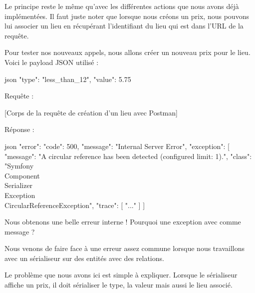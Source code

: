 \documentclass[big]{zmdocument}
\begin{document}
Le principe reste le même qu'avec les différentes actions que nous avons déjà implémentées.
Il faut juste noter que lorsque nous créons un prix, nous pouvons lui associer un lieu en récupérant l'identifiant du lieu qui est dans l'URL de la requête.



Pour tester nos nouveaux appels, nous allons créer un nouveau prix pour le lieu. Voici le payload JSON utilisé :



\begin{CodeBlock}{json}
{
    "type": "less_than_12",
    "value":  5.75
}
\end{CodeBlock}



Requête :



[Corps de la requête de création d'un lieu avec Postman]


Réponse :



\begin{CodeBlock}{json}
{
  "error": {
    "code": 500,
    "message": "Internal Server Error",
    "exception": [
      {
        "message": "A circular reference has been detected (configured limit: 1).",
        "class": "Symfony\\Component\\Serializer\\Exception\\CircularReferenceException",
        "trace": [ "..." ]
      }
    ]
  }
}
\end{CodeBlock}



\begin{Error}
Nous obtenons une belle erreur interne ! Pourquoi une exception avec comme message  ?
\end{Error}




Nous venons de faire face à une erreur assez commune lorsque nous travaillons avec un sérialiseur sur des entités avec des relations.



Le problème que nous avons ici est simple à expliquer. Lorsque le sérialiseur affiche un prix, il doit sérialiser le type, la valeur mais aussi le lieu associé.
\end{document}
